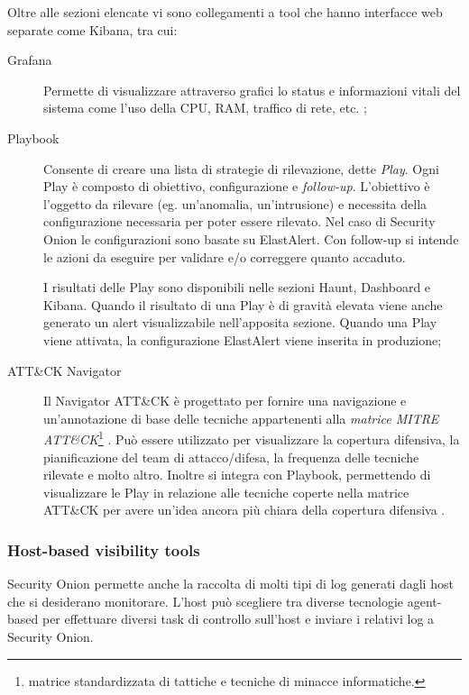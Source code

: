 Oltre alle sezioni elencate vi sono collegamenti a tool che hanno interfacce web separate come Kibana, tra cui:
\begin{description}
    \item [Grafana ]  Permette di visualizzare attraverso grafici lo status e informazioni vitali del sistema come l'uso della CPU, RAM, traffico di rete, etc. \cite{grafana};
    \item [Playbook] Consente di creare una lista di strategie di rilevazione, dette \textit{Play}. Ogni Play è composto di obiettivo, configurazione e \textit{follow-up}. L'obiettivo è l'oggetto da rilevare (eg. un'anomalia, un'intrusione) e necessita della configurazione necessaria per poter essere rilevato. Nel caso di Security Onion le configurazioni sono basate su ElastAlert. Con follow-up si intende le azioni da eseguire per validare e/o correggere quanto accaduto. 

    I risultati delle Play sono disponibili nelle sezioni Haunt, Dashboard e Kibana. Quando il risultato di una Play è di gravità elevata viene anche generato un alert visualizzabile nell'apposita sezione.
    Quando una Play viene attivata, la configurazione ElastAlert viene inserita in produzione;
    \item [ATT\&CK Navigator ] Il Navigator ATT\&CK è progettato per fornire una navigazione e un'annotazione di base delle tecniche appartenenti alla \textit{matrice MITRE ATT\&CK}\footnote{matrice standardizzata di tattiche e tecniche di minacce informatiche.} \cite{att&ck}. Può essere utilizzato  per visualizzare la  copertura difensiva, la pianificazione del  team di attacco/difesa, la frequenza delle tecniche rilevate e molto altro.
    Inoltre si integra con Playbook, permettendo di visualizzare le Play in relazione alle tecniche coperte nella matrice ATT\&CK per avere un'idea ancora più chiara della copertura difensiva \cite{att&ckNavigator}.
\end{description}

\subsubsection*{Host-based visibility tools}
Security Onion permette anche la raccolta di molti tipi di log generati dagli host che si desiderano monitorare. L'host può scegliere tra diverse tecnologie agent-based per effettuare diversi task di controllo sull'host e inviare i relativi log a Security Onion.

